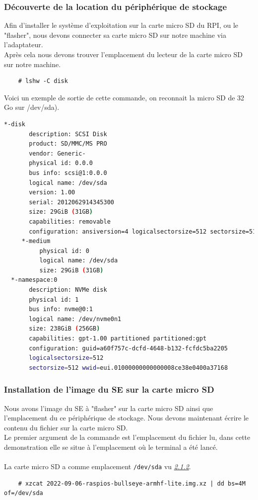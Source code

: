 \documentclass[a4paper]{article}
\begin{document}
\subsubsection{Découverte de la location du périphérique de stockage}
Afin d'installer le système d'exploitation sur la carte micro SD du RPI, ou le "flasher", nous devons connecter sa carte micro SD sur notre machine via l'adaptateur.\\Après cela nous devons trouver l'emplacement du lecteur de la carte micro SD sur notre machine.
\begin{lstlisting}
    # lshw -C disk
\end{lstlisting}
\noindent Voici un exemple de sortie de cette commande, on reconnait la micro SD de 32 Go sur /dev/sda).
\begin{lstlisting}[language=bash]
  *-disk
       description: SCSI Disk
       product: SD/MMC/MS PRO
       vendor: Generic-
       physical id: 0.0.0
       bus info: scsi@1:0.0.0
       logical name: /dev/sda
       version: 1.00
       serial: 2012062914345300
       size: 29GiB (31GB)
       capabilities: removable
       configuration: ansiversion=4 logicalsectorsize=512 sectorsize=512
     *-medium
          physical id: 0
          logical name: /dev/sda
          size: 29GiB (31GB)
  *-namespace:0
       description: NVMe disk
       physical id: 1
       bus info: nvme@0:1
       logical name: /dev/nvme0n1
       size: 238GiB (256GB)
       capabilities: gpt-1.00 partitioned partitioned:gpt
       configuration: guid=a60f757c-dcfd-4648-b132-fcfdc5ba2205 
       logicalsectorsize=512 
       sectorsize=512 wwid=eui.01000000000000008ce38e0400a37168
\end{lstlisting}
\subsubsection{Installation de l'image du SE sur la carte micro SD}
Nous avons l'image du SE à "flasher" sur la carte micro SD ainsi que l'emplacement du ce périphérique de stockage. Nous devons maintenant écrire le contenu du fichier sur la carte micro SD.\\\noindent Le premier argument de la commande est l'emplacement du fichier lu, dans cette demonstration elle se situe à l'emplacement où le terminal a été lancé.\\\\La carte micro SD a comme emplacement \verb|/dev/sda| vu \hyperref[sec:sec01]{\textit{2.1.2}}.
\begin{lstlisting}
    # xzcat 2022-09-06-raspios-bullseye-armhf-lite.img.xz | dd bs=4M of=/dev/sda
\end{lstlisting}
\end{document}
